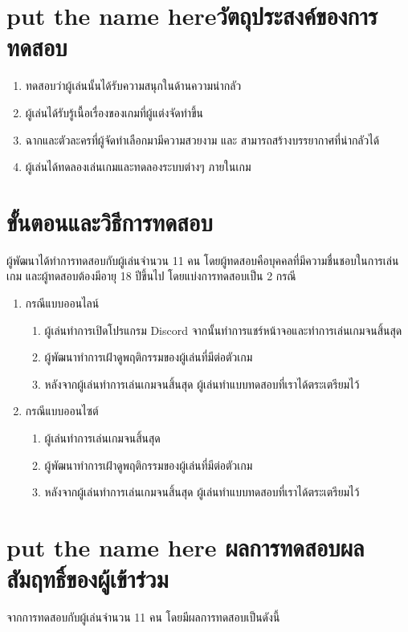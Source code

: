 \section{\ifenglish put the name here\else วัตถุประสงค์ของการทดสอบ\fi}
\begin{enumerate}
    \item ทดสอบว่าผู้เล่นนั้นได้รับความสนุกในด้านความน่ากลัว
    \item ผู้เล่นได้รับรู้เนื้อเรื่องของเกมที่ผู้แต่งจัดทำขึ้น
    \item ฉากและตัวละครที่ผู้จัดทำเลือกมามีความสวยงาม และ สามารถสร้างบรรยากาศที่น่ากลัวได้
    \item ผู้เล่นได้ทดลองเล่นเกมและทดลองระบบต่างๆ ภายในเกม
\end{enumerate}

\section{ขั้นตอนและวิธีการทดสอบ}
ผู้พัฒนาได้ทำการทดสอบกับผู้เล่นจำนวน 11 คน โดยผู้ทดสอบคือบุคคลที่มีความชื่นชอบในการเล่นเกม และผู้ทดสอบต้องมีอายุ 18 ปีขึ้นไป โดยแบ่งการทดสอบเป็น 2 กรณี
\begin{enumerate}
    \item กรณีแบบออนไลน์
          \begin{enumerate}
              \item ผู้เล่นทำการเปิดโปรแกรม Discord จากนั้นทำการแชร์หน้าจอและทำการเล่นเกมจนสิ้นสุด
              \item ผู้พัฒนาทำการเฝ้าดูพฤติกรรมของผู้เล่นที่มีต่อตัวเกม
              \item หลังจากผู้เล่นทำการเล่นเกมจนสิ้นสุด ผู้เล่นทำแบบทดสอบที่เราได้ตระเตรียมไว้
          \end{enumerate}
    \item กรณีแบบออนไซต์
          \begin{enumerate}
              \item ผู้เล่นทำการเล่นเกมจนสิ้นสุด
              \item ผู้พัฒนาทำการเฝ้าดูพฤติกรรมของผู้เล่นที่มีต่อตัวเกม
              \item หลังจากผู้เล่นทำการเล่นเกมจนสิ้นสุด ผู้เล่นทำแบบทดสอบที่เราได้ตระเตรียมไว้
          \end{enumerate}
\end{enumerate}

\section{\ifenglish put the name here \else ผลการทดสอบผลสัมฤทธิ์ของผู้เข้าร่วม\fi}
จากการทดสอบกับผู้เล่นจำนวน 11 คน โดยมีผลการทดสอบเป็นดังนี้

